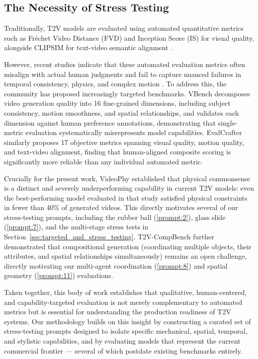 \documentclass[sigconf]{acmart}
\begin{document}
\subsection{The Necessity of Stress Testing}
\label{sec:stress_necessity}

Traditionally, T2V models are evaluated using automated quantitative metrics
such as Fr\'{e}chet Video Distance (FVD) and Inception Score (IS) for visual
quality, alongside CLIPSIM for text-video semantic alignment
\cite{xie2025comprehensive}.

However, recent studies indicate that these automated evaluation metrics often
misalign with actual human judgments and fail to capture nuanced failures in
temporal consistency, physics, and complex motion \cite{huang2024vbench,
    liu2024evalcrafter}. To address this, the community has proposed increasingly
targeted benchmarks. VBench \cite{huang2024vbench} decomposes video generation
quality into 16 fine-grained dimensions, including subject consistency,
motion smoothness, and spatial relationships, and validates each dimension
against human preference annotations, demonstrating that single-metric
evaluation systematically misrepresents model capabilities. EvalCrafter
\cite{liu2024evalcrafter} similarly proposes 17 objective metrics spanning
visual quality, motion quality, and text-video alignment, finding that
human-aligned composite scoring is significantly more reliable than any
individual automated metric.

Crucially for the present work, VideoPhy \cite{bansal2024videophy} established
that physical commonsense is a distinct and severely underperforming capability
in current T2V models: even the best-performing model evaluated in that study
satisfied physical constraints in fewer than 40\% of generated videos. This
directly motivates several of our stress-testing prompts, including the rubber
ball (\ref{prompt:2}), glass slide (\ref{prompt:7}), and the
multi-stage stress tests in Section~\ref{sec:targeted_and_stress_testing}. T2V-CompBench
\cite{sun2024t2vcompbench} further demonstrated that compositional generation (coordinating multiple objects, their attributes, and spatial relationships
simultaneously) remains an open challenge, directly motivating our
multi-agent coordination (\ref{prompt:8}) and spatial geometry
(\ref{prompt:11}) evaluations.

Taken together, this body of work establishes that qualitative, human-centered,
and capability-targeted evaluation is not merely complementary to automated
metrics but is essential for understanding the production readiness of T2V
systems. Our methodology builds on this insight by constructing a curated set
of stress-testing prompts designed to isolate specific mechanical, spatial,
temporal, and stylistic capabilities, and by evaluating models that represent
the current commercial frontier — several of which postdate existing benchmarks
entirely.
\end{document}
